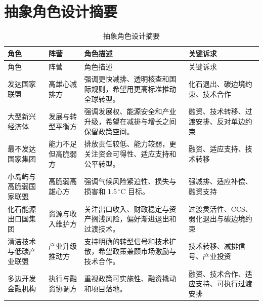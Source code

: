 \documentclass[12pt,a4paper]{ctexart}
\begin{document}
\section{抽象角色设计摘要}
\begin{longtable}{>{\raggedright\arraybackslash}p{2.8cm} >{\raggedright\arraybackslash}p{2.3cm} >{\raggedright\arraybackslash}p{5.2cm} >{\raggedright\arraybackslash}p{4cm}}
\caption{抽象角色设计摘要}\label{tab:roles}\\
\toprule
角色 & 阵营 & 角色描述 & 关键诉求 \\
\midrule
\endfirsthead
\toprule
角色 & 阵营 & 角色描述 & 关键诉求 \\
\midrule
\endhead
发达国家联盟 & 高雄心减排方 & 强调更快减排、透明核查和国际规则，希望用更高标准推动全球转型。 & 化石退出、碳边境约束、技术合作 \\
大型新兴经济体 & 发展与转型平衡方 & 强调发展权、能源安全和产业升级，希望在减排与增长之间保留政策空间。 & 融资、技术转移、过渡安排、反对单边约束 \\
最不发达国家集团 & 能力不足但高脆弱方 & 排放责任较低、能力较弱，更关注资金可得性、适应支持和公平转型。 & 融资、适应支持、技术转移 \\
小岛屿与高脆弱国家联盟 & 高脆弱高雄心方 & 强调气候风险紧迫性、损失与损害和 1.5\,$^{\circ}$C 目标。 & 强减排、适应补偿、融资支持 \\
化石能源出口国集团 & 资源与收入维护方 & 关注出口收入、财政稳定与资产搁浅风险，偏好渐进退出和过渡技术。 & 过渡灵活性、CCS、弱化退出与碳边境约束 \\
清洁技术与低碳产业联盟 & 产业升级推动方 & 支持明确的转型信号和技术扩散，希望政策兼顾市场激励与技术合作。 & 技术转移、减排信号、产业投资 \\
多边开发金融机构 & 执行与融资协调方 & 重视政策可实施性、融资撬动和项目落地。 & 融资、技术合作、适应支持、可执行过渡安排 \\
\bottomrule
\end{longtable}
\end{document}
